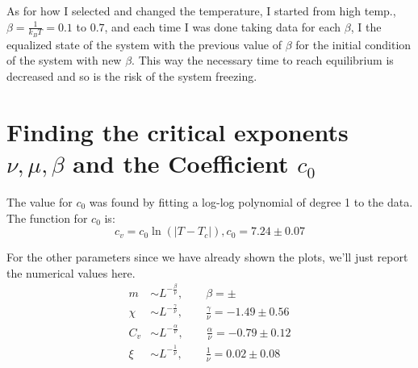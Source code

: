 \documentclass[12pt, a4paper]{article}
\begin{document}
	As for how I selected and changed the temperature, I started from high temp., 
	$\beta =\frac{1}{k_B T} = 0.1$ to $0.7$, and each time I was done taking data for each 
	$\beta$, I the equalized state of the system with the previous value of $\beta$ for the initial 
	condition of the system with new $\beta$. This way the necessary time to reach equilibrium is decreased and so is the risk of the system freezing.
	
	\section{Finding the critical exponents $\nu, \mu, \beta$ and the Coefficient $c_0$}
	The value for $c_0$ was found by fitting a log-log polynomial of degree 1 to the data. The function for $c_0$ is:
	\begin{equation}
		c_v = c_0 \ln(|T - T_c|), c_0 = 7.24 \pm 0.07
	\end{equation}
	
	For the other parameters since we have already shown the plots, we'll just report the numerical values here.
	\begin{equation}
	\begin{aligned}
		m &\sim L^{-\frac{\beta}{\nu}}, \qquad \beta = \pm \\
		\chi &\sim L^{-\frac{\gamma}{\nu}}, \qquad \frac{\gamma}{\nu} = - 1.49 \pm 0.56\\
		C_v &\sim L^{-\frac{\alpha}{\nu}}, \qquad \frac{\alpha}{\nu} = - 0.79 \pm 0.12\\
		\xi & \sim L^{-\frac{1}{\nu}}, \qquad \frac{1}{\nu} = 0.02\pm 0.08
	\end{aligned}
	\end{equation}
\end{document}
